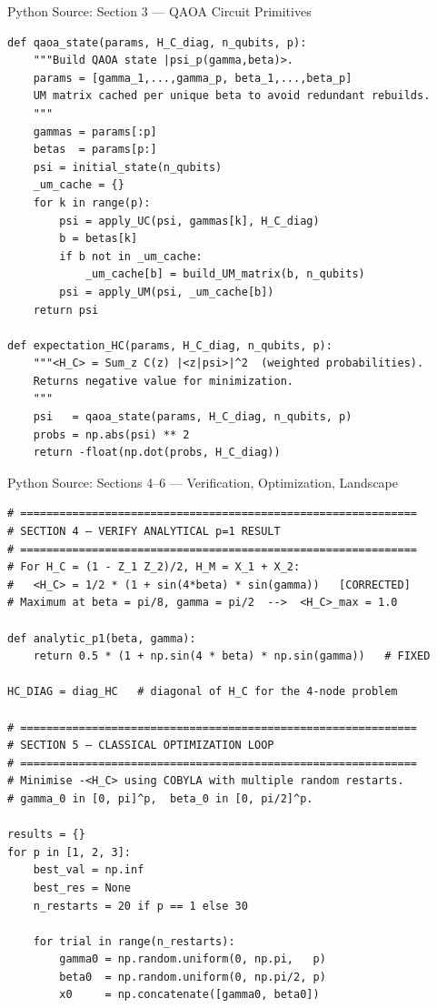 \documentclass{beamer}
\begin{document}
\begin{frame}
\begin{frame}{Python Source: Section 3 — QAOA Circuit Primitives}
\begin{verbatim}
def qaoa_state(params, H_C_diag, n_qubits, p):
    """Build QAOA state |psi_p(gamma,beta)>.
    params = [gamma_1,...,gamma_p, beta_1,...,beta_p]
    UM matrix cached per unique beta to avoid redundant rebuilds.
    """
    gammas = params[:p]
    betas  = params[p:]
    psi = initial_state(n_qubits)
    _um_cache = {}
    for k in range(p):
        psi = apply_UC(psi, gammas[k], H_C_diag)
        b = betas[k]
        if b not in _um_cache:
            _um_cache[b] = build_UM_matrix(b, n_qubits)
        psi = apply_UM(psi, _um_cache[b])
    return psi

def expectation_HC(params, H_C_diag, n_qubits, p):
    """<H_C> = Sum_z C(z) |<z|psi>|^2  (weighted probabilities).
    Returns negative value for minimization.
    """
    psi   = qaoa_state(params, H_C_diag, n_qubits, p)
    probs = np.abs(psi) ** 2
    return -float(np.dot(probs, H_C_diag))
\end{verbatim}
\end{frame}


\begin{frame}{Python Source: Sections 4--6 — Verification, Optimization, Landscape}
\footnotesize
\begin{verbatim}
# =============================================================
# SECTION 4 — VERIFY ANALYTICAL p=1 RESULT
# =============================================================
# For H_C = (1 - Z_1 Z_2)/2, H_M = X_1 + X_2:
#   <H_C> = 1/2 * (1 + sin(4*beta) * sin(gamma))   [CORRECTED]
# Maximum at beta = pi/8, gamma = pi/2  -->  <H_C>_max = 1.0

def analytic_p1(beta, gamma):
    return 0.5 * (1 + np.sin(4 * beta) * np.sin(gamma))   # FIXED

HC_DIAG = diag_HC   # diagonal of H_C for the 4-node problem

# =============================================================
# SECTION 5 — CLASSICAL OPTIMIZATION LOOP
# =============================================================
# Minimise -<H_C> using COBYLA with multiple random restarts.
# gamma_0 in [0, pi]^p,  beta_0 in [0, pi/2]^p.

results = {}
for p in [1, 2, 3]:
    best_val = np.inf
    best_res = None
    n_restarts = 20 if p == 1 else 30

    for trial in range(n_restarts):
        gamma0 = np.random.uniform(0, np.pi,   p)
        beta0  = np.random.uniform(0, np.pi/2, p)
        x0     = np.concatenate([gamma0, beta0])


\end{verbatim}
\end{frame}
\end{frame}
\end{document}
